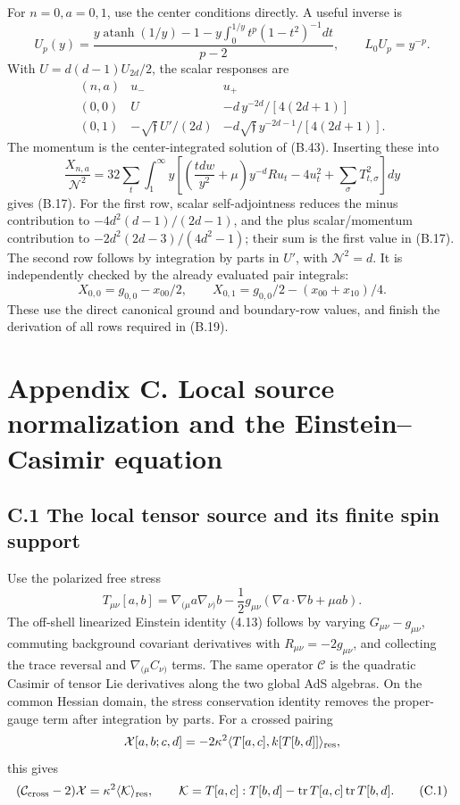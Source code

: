 For \(n=0,a=0,1\), use the center conditions directly. A useful inverse is \[
U_p(y)=\frac{y\operatorname{atanh}(1/y)-1
-y\int_0^{1/y}t^p(1-t^2)^{-1}dt}{p-2},
\qquad L_0U_p=y^{-p}.
\] With \(U=d(d-1)U_{2d}/2\), the scalar responses are \[
\begin{array}{c|cc}
(n,a)&u_-&u_+\\ \hline
(0,0)&U&-d\,y^{-2d}/[4(2d+1)]\\
(0,1)&-\sqrt{\mathfrak f}\,U'/(2d)&
-d\sqrt{\mathfrak f}\,y^{-2d-1}/[4(2d+1)] .
\end{array}
\tag{B.57}
\] The momentum is the center-integrated solution of (B.43). Inserting these into \[
\frac{X_{n,a}}{\mathcal N^2}
=32\sum_t\int_1^\infty y
\left[
\left(\frac{tdw}{y^2}+\mu\right)y^{-d}Ru_t
-4u_t^2+\sum_\sigma T_{t,\sigma}^2
\right]dy
\] gives (B.17). For the first row, scalar self-adjointness reduces the minus contribution to \(-4d^2(d-1)/(2d-1)\), and the plus scalar/momentum contribution to \(-2d^2(2d-3)/(4d^2-1)\); their sum is the first value in (B.17). The second row follows by integration by parts in \(U'\), with \(\mathcal N^2=d\). It is independently checked by the already evaluated pair integrals: \[
X_{0,0}=g_{0,0}-x_{00}/2,\qquad
X_{0,1}=g_{0,0}/2-(x_{00}+x_{10})/4 .
\] These use the direct canonical ground and boundary-row values, and finish the derivation of all rows required in (B.19).

\clearpage
\hypertarget{appendix-c.-local-source-normalization-and-the-einsteincasimir-equation}{%
\section{Appendix C. Local source normalization and the Einstein--Casimir equation}\label{appendix-c.-local-source-normalization-and-the-einsteincasimir-equation}}

\hypertarget{c.1-the-local-tensor-source-and-its-finite-spin-support}{%
\subsection{C.1 The local tensor source and its finite spin support}\label{c.1-the-local-tensor-source-and-its-finite-spin-support}}

Use the polarized free stress \[
T_{\mu\nu}[a,b]
=\nabla_{(\mu}a\nabla_{\nu)}b
-\frac12g_{\mu\nu}(\nabla a\cdot\nabla b+\mu ab).
\] The off-shell linearized Einstein identity (4.13) follows by varying \(G_{\mu\nu}-g_{\mu\nu}\), commuting background covariant derivatives with \(R_{\mu\nu}=-2g_{\mu\nu}\), and collecting the trace reversal and \(\nabla_{(\mu}C_{\nu)}\) terms. The same operator \(\mathcal C\) is the quadratic Casimir of tensor Lie derivatives along the two global AdS algebras. On the common Hessian domain, the stress conservation identity removes the proper-gauge term after integration by parts. For a crossed pairing \[
\mathcal X[a,b;c,d]
=-2\kappa^2\langle T[a,c],k[T[b,d]]\rangle_{\rm res},
\] this gives \[
(\mathcal C_{\rm cross}-2)\mathcal X
=\kappa^2\langle\mathcal K\rangle_{\rm res},\qquad
\mathcal K=T[a,c]:T[b,d]
-\operatorname{tr}T[a,c]\operatorname{tr}T[b,d].
\tag{C.1}
\]

